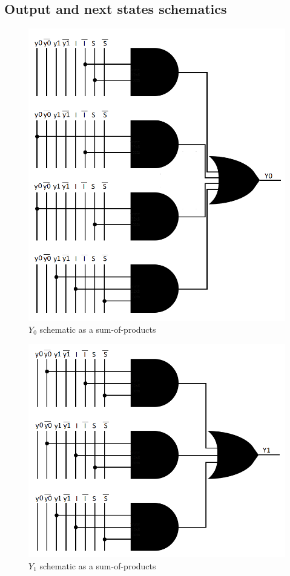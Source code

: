 \documentclass[../../e3_tp3_main.tex]{subfiles}
\begin{document}
\subsection{Output and next states schematics}
\begin{figure}[H]
	\centering
	\includegraphics{figures/mealy_Y0_schem.PNG}
	\caption{$Y_0$ schematic as a sum-of-products}
	\label{fig:ej1_mealy_Y0_schem}
\end{figure}
\begin{figure}[H]
	\centering
	\includegraphics{figures/mealy_Y1_schem.PNG}
	\caption{$Y_1$ schematic as a sum-of-products}
	\label{fig:ej1_mealy_Y1_schem}
\end{figure}
\end{document}
